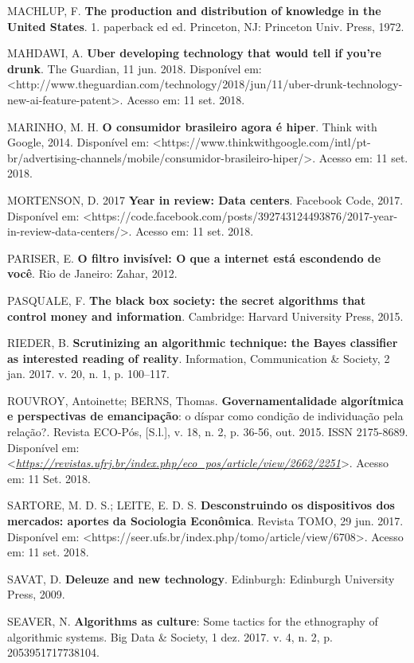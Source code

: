 MACHLUP, F. \textbf{The production and distribution of knowledge in the
United States}. 1. paperback ed ed. Princeton, NJ: Princeton Univ.
Press, 1972.

MAHDAWI, A. \textbf{Uber developing technology that would tell if you're
drunk}. The Guardian, 11 jun. 2018. Disponível em:
\textless{}http://www.theguardian.com/technology/2018/jun/11/uber-drunk-technology-new-ai-feature-patent\textgreater{}.
Acesso em: 11 set. 2018.

MARINHO, M. H. \textbf{O consumidor brasileiro agora é hiper}. Think
with Google, 2014. Disponível em:
\textless{}https://www.thinkwithgoogle.com/intl/pt-br/advertising-channels/mobile/consumidor-brasileiro-hiper/\textgreater{}.
Acesso em: 11 set. 2018.

MORTENSON, D. 2017 \textbf{Year in review: Data centers}. Facebook Code,
2017. Disponível em:
\textless{}https://code.facebook.com/posts/392743124493876/2017-year-in-review-data-centers/\textgreater{}.
Acesso em: 11 set. 2018.

PARISER, E. \textbf{O filtro invisível: O que a internet está escondendo
de você}. Rio de Janeiro: Zahar, 2012.

PASQUALE, F. \textbf{The black box society: the secret algorithms that
control money and information}. Cambridge: Harvard University Press,
2015.

RIEDER, B. \textbf{Scrutinizing an algorithmic technique: the Bayes
classifier as interested reading of reality}. Information, Communication
\& Society, 2 jan. 2017. v. 20, n. 1, p. 100--117.

ROUVROY, Antoinette; BERNS, Thomas. \textbf{Governamentalidade
algorítmica e perspectivas de emancipação}: o díspar como condição de
individuação pela relação?. Revista ECO-Pós, {[}S.l.{]}, v. 18, n. 2, p.
36-56, out. 2015. ISSN 2175-8689. Disponível em:
\textless{}\href{https://revistas.ufrj.br/index.php/eco_pos/article/view/2662/2251}{\emph{https://revistas.ufrj.br/index.php/eco\_pos/article/view/2662/2251}}\textgreater{}.
Acesso em: 11 Set. 2018.

SARTORE, M. D. S.; LEITE, E. D. S. \textbf{Desconstruindo os
dispositivos dos mercados: aportes da Sociologia Econômica}. Revista
TOMO, 29 jun. 2017. Disponível em:
\textless{}https://seer.ufs.br/index.php/tomo/article/view/6708\textgreater{}.
Acesso em: 11 set. 2018.

SAVAT, D. \textbf{Deleuze and new technology}. Edinburgh: Edinburgh
University Press, 2009.

SEAVER, N. \textbf{Algorithms as culture}: Some tactics for the
ethnography of algorithmic systems. Big Data \& Society, 1 dez. 2017. v.
4, n. 2, p. 2053951717738104.

